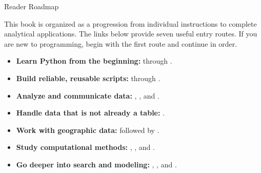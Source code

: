 \h*{Reader Roadmap}
\label{reader:roadmap}

This book is organized as a progression from individual instructions to
complete analytical applications. The links below provide seven useful entry
routes. If you are new to programming, begin with the first route and continue
in order.

\begin{tcolorbox}[title=Choose a learning route,colframe=orange,colback=white,arc=2mm]
\begin{itemize}
    \item \textbf{Learn Python from the beginning:}
           through .
    \item \textbf{Build reliable, reusable scripts:}
           through .
    \item \textbf{Analyze and communicate data:}
          , , and
          .
    \item \textbf{Handle data that is not already a table:}
          .
    \item \textbf{Work with geographic data:}
           followed by
          .
    \item \textbf{Study computational methods:}
          ,
          , and
          .
    \item \textbf{Go deeper into search and modeling:}
          ,
          , and
          .
\end{itemize}
\end{tcolorbox}


